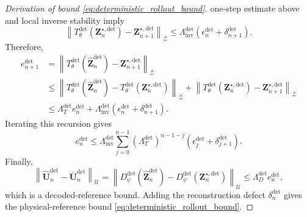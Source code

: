 \documentclass[11pt]{article}
\begin{document}
\begin{proof}[Derivation of bound \eqref{eq:deterministic_rollout_bound}]
one-step estimate above and local inverse stability imply
\[
    \left\|
    T_\theta^{\mathrm{det}}(\mathbf Z_n^{\star,\mathrm{det}})
    -
    \mathbf Z_{n+1}^{\star,\mathrm{det}}
    \right\|_{\mathcal Z}
    \le
    \Lambda_{\mathrm{inv}}^{\mathrm{det}}
    \left(
    \epsilon_n^{\mathrm{det}}
    +
    \delta_{n+1}^{\mathrm{det}}
    \right).
\]
Therefore,
\[
\begin{aligned}
    e_{n+1}^{\mathrm{det}}
    &=
    \left\|
    T_\theta^{\mathrm{det}}(\widehat{\mathbf Z}_n^{\mathrm{det}})
    -
    \mathbf Z_{n+1}^{\star,\mathrm{det}}
    \right\|_{\mathcal Z}
    \\
    &\le
    \left\|
    T_\theta^{\mathrm{det}}(\widehat{\mathbf Z}_n^{\mathrm{det}})
    -
    T_\theta^{\mathrm{det}}(\mathbf Z_n^{\star,\mathrm{det}})
    \right\|_{\mathcal Z}
    +
    \left\|
    T_\theta^{\mathrm{det}}(\mathbf Z_n^{\star,\mathrm{det}})
    -
    \mathbf Z_{n+1}^{\star,\mathrm{det}}
    \right\|_{\mathcal Z}
    \\
    &\le
    \Lambda_T^{\mathrm{det}}e_n^{\mathrm{det}}
    +
    \Lambda_{\mathrm{inv}}^{\mathrm{det}}
    \left(
    \epsilon_n^{\mathrm{det}}
    +
    \delta_{n+1}^{\mathrm{det}}
    \right).
\end{aligned}
\]
Iterating this recursion gives
\[
    e_n^{\mathrm{det}}
    \le
    \Lambda_{\mathrm{inv}}^{\mathrm{det}}
    \sum_{j=0}^{n-1}
    \left(
    \Lambda_T^{\mathrm{det}}
    \right)^{n-1-j}
    \left(
    \epsilon_j^{\mathrm{det}}
    +
    \delta_{j+1}^{\mathrm{det}}
    \right).
\]
Finally,
\[
    \left\|
    \widehat{\mathbf U}_n^{\mathrm{det}}
    -
    \bar{\mathbf U}_n^{\mathrm{det}}
    \right\|_{\mathcal U}=
    \left\|
    D_\psi^{\mathrm{det}}(\widehat{\mathbf Z}_n^{\mathrm{det}})
    -
    D_\psi^{\mathrm{det}}(\mathbf Z_n^{\star,\mathrm{det}})
    \right\|_{\mathcal U}\le
    \Lambda_D^{\mathrm{det}}e_n^{\mathrm{det}},
\]
which is a decoded-reference bound. Adding the reconstruction defect $\delta_n^{\mathrm{det}}$ gives the physical-reference bound \eqref{eq:deterministic_rollout_bound}.
\end{proof}
\fi 
\end{document}
